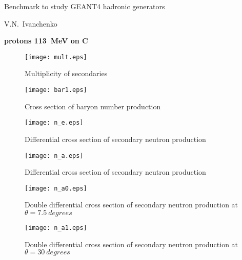 \documentclass[12pt]{article}
\begin{document}
\pagestyle{empty}

\begin{center}
{\large Benchmark to study GEANT4 hadronic generators} 

\vspace*{5mm}
V.N.~Ivanchenko

\vspace*{5mm}


\vspace*{5mm}

{\bf protons 113~MeV on C} 

\vspace*{5mm}


\end{center}

\begin{figure}[htbp]
\caption{Multiplicity of secondaries}
\label{fig1a}  
\centerline{\texttt{[image: mult.eps]}}
\end{figure}

\begin{figure}[htbp]
\caption{Cross section of baryon number production}
\label{fig1b}  
\centerline{\texttt{[image: bar1.eps]}}
\end{figure}

\begin{figure}[htbp]
\caption{Differential cross section of secondary neutron production}
\label{fig7}  
\centerline{\texttt{[image: n\_e.eps]}}
\end{figure}
\begin{figure}[htbp]
\caption{Differential cross section of secondary neutron production}
\label{fig10} 
\centerline{\texttt{[image: n\_a.eps]}}
\end{figure}

\clearpage


\begin{figure}[htbp]
\caption{Double differential cross section of secondary neutron production at $\theta = 7.5~degrees$}
\label{figa0} 
\centerline{\texttt{[image: n\_a0.eps]}}
\end{figure}


\begin{figure}[htbp]
\caption{Double differential cross section of secondary neutron production at $\theta = 30~degrees$}
\label{figa1} 
\centerline{\texttt{[image: n\_a1.eps]}}
\end{figure}
\end{document}

